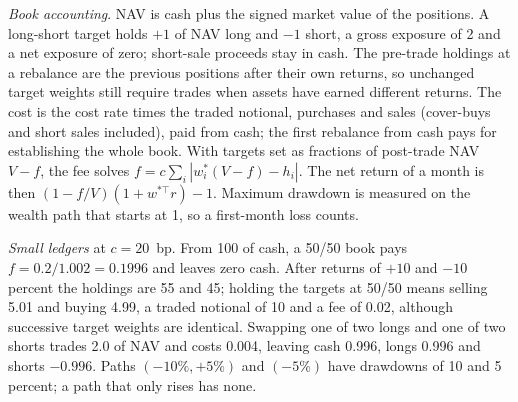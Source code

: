 \begin{qfmethod}
\emph{Book accounting}. NAV is cash plus the signed market value of the positions. A long-short target holds $+1$ of NAV long and $-1$ short, a gross exposure of 2 and a net exposure of zero; short-sale proceeds stay in cash. The pre-trade holdings at a rebalance are the previous positions after their own returns, so unchanged target weights still require trades when assets have earned different returns. The cost is the cost rate times the traded notional, purchases and sales (cover-buys and short sales included), paid from cash; the first rebalance from cash pays for establishing the whole book. With targets set as fractions of post-trade NAV $V-f$, the fee solves $f=c\sum_i|w^*_i(V-f)-h_i|$. The net return of a month is then $(1-f/V)(1+w^{*\top}r)-1$. Maximum drawdown is measured on the wealth path that starts at 1, so a first-month loss counts.

 \emph{Small ledgers} at $c=20$~bp. From 100 of cash, a 50/50 book pays $f=0.2/1.002=0.1996$ and leaves zero cash. After returns of $+10$ and $-10$ percent the holdings are 55 and 45; holding the targets at 50/50 means selling 5.01 and buying 4.99, a traded notional of 10 and a fee of 0.02, although successive target weights are identical. Swapping one of two longs and one of two shorts trades 2.0 of NAV and costs 0.004, leaving cash 0.996, longs 0.996 and shorts $-0.996$. Paths $(-10\%,+5\%)$ and $(-5\%)$ have drawdowns of 10 and 5 percent; a path that only rises has none.


\end{qfmethod}

